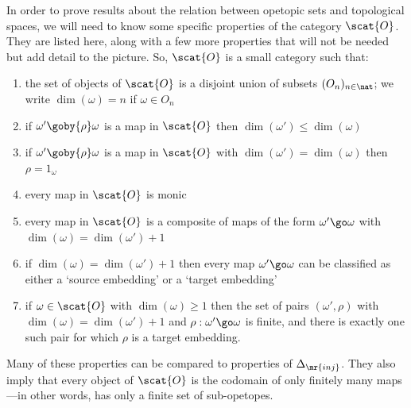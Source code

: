 In order to prove results about the relation between opetopic sets and
topological spaces, we will need to know some specific properties of the
category $\scat{O}$.  They are listed here, along with a few more
properties that will not be needed but add detail to the picture.  So,
$\scat{O}$ is a small category such that:
%
\begin{enumerate}
\item	{}
the set of objects of $\scat{O}$ is a disjoint union of subsets
  $(O_n)_{n\in\nat}$; we write $\dim(\omega) = n$ if $\omega \in O_n$
\item	{}
if $\omega' \goby{\rho} \omega$ is a map in $\scat{O}$ then
  $\dim(\omega') \leq \dim(\omega)$ 
\item	{}
if $\omega' \goby{\rho} \omega$ is a map in $\scat{O}$ with
  $\dim(\omega') = \dim(\omega)$ then $\rho=1_\omega$
\item every map in $\scat{O}$ is monic
\item every map in $\scat{O}$ is a composite of maps of the form $\omega'
  \go \omega$ with $\dim(\omega) = \dim(\omega') + 1$
\item if $\dim(\omega) = \dim(\omega') + 1$ then every map $\omega' \go
  \omega$ can be classified as either a `source%
%
%
embedding' or a `target%
%
%
  embedding' 
\item	{}
if $\omega \in \scat{O}$ with $\dim(\omega) \geq 1$ then the set of pairs
  $(\omega',\rho)$ with $\dim(\omega) = \dim(\omega') + 1$ and $\rho:
  \omega' \go \omega$ is finite, and there is exactly one such pair for
  which $\rho$ is a target embedding.
\end{enumerate}
%
Many of these properties can be compared to properties of $\Delta_\mr{inj}$. 
They also imply that every object of $\scat{O}$ is the codomain of only
finitely many maps---in other words, has only a finite set of sub-opetopes.

